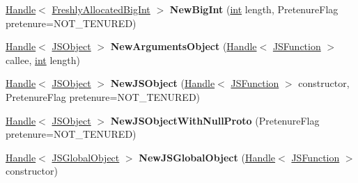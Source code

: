 \begin{DoxyCompactItemize}
\item 
\mbox{\label{classv8_1_1internal_1_1Factory_a3b3b98690559a9746ca3d6c55f0cc5ab}} 
\mbox{\hyperlink{classv8_1_1internal_1_1Handle}{Handle}}$<$ \mbox{\hyperlink{classv8_1_1internal_1_1FreshlyAllocatedBigInt}{Freshly\+Allocated\+Big\+Int}} $>$ {\bfseries New\+Big\+Int} (\mbox{\hyperlink{classint}{int}} length, Pretenure\+Flag pretenure=N\+O\+T\+\_\+\+T\+E\+N\+U\+R\+ED)
\item 
\mbox{\label{classv8_1_1internal_1_1Factory_aa3912ca0745f19250298156de9d8b455}} 
\mbox{\hyperlink{classv8_1_1internal_1_1Handle}{Handle}}$<$ \mbox{\hyperlink{classv8_1_1internal_1_1JSObject}{J\+S\+Object}} $>$ {\bfseries New\+Arguments\+Object} (\mbox{\hyperlink{classv8_1_1internal_1_1Handle}{Handle}}$<$ \mbox{\hyperlink{classv8_1_1internal_1_1JSFunction}{J\+S\+Function}} $>$ callee, \mbox{\hyperlink{classint}{int}} length)
\item 
\mbox{\label{classv8_1_1internal_1_1Factory_a76f8b4906c8d7d5b13e4894f7e9023b9}} 
\mbox{\hyperlink{classv8_1_1internal_1_1Handle}{Handle}}$<$ \mbox{\hyperlink{classv8_1_1internal_1_1JSObject}{J\+S\+Object}} $>$ {\bfseries New\+J\+S\+Object} (\mbox{\hyperlink{classv8_1_1internal_1_1Handle}{Handle}}$<$ \mbox{\hyperlink{classv8_1_1internal_1_1JSFunction}{J\+S\+Function}} $>$ constructor, Pretenure\+Flag pretenure=N\+O\+T\+\_\+\+T\+E\+N\+U\+R\+ED)
\item 
\mbox{\label{classv8_1_1internal_1_1Factory_a22779dcb19ef0404e513a8400ae2bc75}} 
\mbox{\hyperlink{classv8_1_1internal_1_1Handle}{Handle}}$<$ \mbox{\hyperlink{classv8_1_1internal_1_1JSObject}{J\+S\+Object}} $>$ {\bfseries New\+J\+S\+Object\+With\+Null\+Proto} (Pretenure\+Flag pretenure=N\+O\+T\+\_\+\+T\+E\+N\+U\+R\+ED)
\item 
\mbox{\label{classv8_1_1internal_1_1Factory_adaab8d7f594c992eb74050e0313f9d41}} 
\mbox{\hyperlink{classv8_1_1internal_1_1Handle}{Handle}}$<$ \mbox{\hyperlink{classv8_1_1internal_1_1JSGlobalObject}{J\+S\+Global\+Object}} $>$ {\bfseries New\+J\+S\+Global\+Object} (\mbox{\hyperlink{classv8_1_1internal_1_1Handle}{Handle}}$<$ \mbox{\hyperlink{classv8_1_1internal_1_1JSFunction}{J\+S\+Function}} $>$ constructor)
\item 

\end{DoxyCompactItemize}
